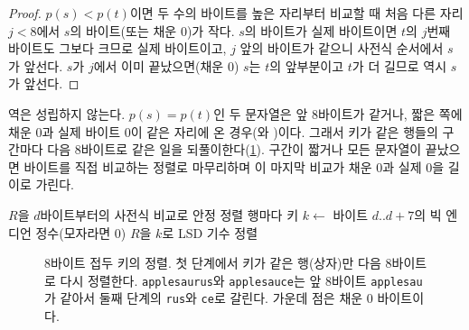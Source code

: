 \begin{proof}
$p(s)<p(t)$이면 두 수의 바이트를 높은 자리부터 비교할 때 처음 다른 자리 $j<8$에서 $s$의 바이트(또는 채운 $0$)가 작다. $s$의 바이트가 실제 바이트이면 $t$의 $j$번째 바이트도 그보다 크므로 실제 바이트이고, $j$ 앞의 바이트가 같으니 사전식 순서에서 $s$가 앞선다. $s$가 $j$에서 이미 끝났으면(채운 $0$) $s$는 $t$의 앞부분이고 $t$가 더 길므로 역시 $s$가 앞선다.
\end{proof}

역은 성립하지 않는다. $p(s)=p(t)$인 두 문자열은 앞 8바이트가 같거나, 짧은 쪽에 채운 $0$과 실제 바이트 $0$이 같은 자리에 온 경우(와 )이다. 그래서 키가 같은 행들의 구간마다 다음 8바이트로 같은 일을 되풀이한다(\cref{fig:string-keys}). 구간이 짧거나 모든 문자열이 끝났으면 바이트를 직접 비교하는 정렬로 마무리하며 이 마지막 비교가 채운 $0$과 실제 $0$을 길이로 가린다.

\begin{algorithm}[htbp]
\begin{algorithmic}[1]
 
    \State $R$을 $d$바이트부터의 사전식 비교로 안정 정렬 
    \State \Return
  \EndIf
  \State 행마다 키 $k\gets$ 바이트 $d..d+7$의 빅 엔디언 정수(모자라면 $0$)
  \State $R$을 $k$로 LSD 기수 정렬 
    \State {}
  \EndFor
\EndFunction
\end{algorithmic}
\caption{접두 키로 문자열 정렬 (데이터프레임의 문자열 정렬, MSD 방식)}
\label{alg:string-sort}
\end{algorithm}

\begin{figure}[htbp]
\centering
{}
\caption{8바이트 접두 키의 정렬. 첫 단계에서 키가 같은 행(상자)만 다음 8바이트로 다시 정렬한다. \texttt{applesaurus}와 \texttt{applesauce}는 앞 8바이트 \texttt{applesau}가 같아서 둘째 단계의 \texttt{rus}와 \texttt{ce}로 갈린다. 가운데 점은 채운 $0$ 바이트이다.}
\label{fig:string-keys}
\end{figure}

